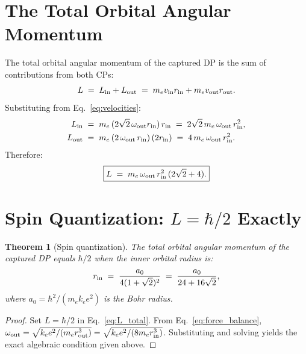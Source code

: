 \documentclass[12pt]{article}
\newtheorem{theorem}{Theorem}[section]
\newcommand{\rin}{r_{\rm in}}
\newcommand{\rout}{r_{\rm out}}
\newcommand{\oout}{\omega_{\rm out}}
\newcommand{\aBohr}{a_0}
\begin{document}
\section{The Total Orbital Angular Momentum}
\label{sec:angmom}

The total orbital angular momentum of the captured DP is the sum of
contributions from both CPs:
\begin{equation}
  L \;=\; L_{\rm in} + L_{\rm out}
  \;=\; m_e v_{\rm in}\rin + m_e v_{\rm out}\rout.
  \label{eq:L_sum}
\end{equation}
Substituting from Eq.~\eqref{eq:velocities}:
\begin{align}
  L_{\rm in} &\;=\; m_e\,(2\sqrt{2}\,\oout\rin)\,\rin
  \;=\; 2\sqrt{2}\,m_e\,\oout\,\rin^2, \notag\\
  L_{\rm out} &\;=\; m_e\,(2\,\oout\,\rin)\,(2\rin)
  \;=\; 4\,m_e\,\oout\,\rin^2.
  \label{eq:L_parts}
\end{align}
Therefore:
\begin{equation}
  \boxed{L \;=\; m_e\,\oout\,\rin^2\,(2\sqrt{2}+4).}
  \label{eq:L_total}
\end{equation}

\section{Spin Quantization: $L = \hbar/2$ Exactly}
\label{sec:quantization}

\begin{theorem}[Spin quantization]
\label{thm:spin}
The total orbital angular momentum of the captured DP equals $\hbar/2$
when the inner orbital radius is:
\begin{equation}
  \rin \;=\; \frac{\aBohr}{4(1+\sqrt{2})^2}
  \;=\; \frac{\aBohr}{24+16\sqrt{2}},
  \label{eq:rin}
\end{equation}
where $\aBohr = \hbar^2/(m_e k_e e^2)$ is the Bohr radius.
\end{theorem}

\begin{proof}
Set $L = \hbar/2$ in Eq.~\eqref{eq:L_total}.  From
Eq.~\eqref{eq:force_balance}, $\oout = \sqrt{k_e e^2/(m_e\rout^3)} =
\sqrt{k_e e^2/(8m_e\rin^3)}$.  Substituting and solving yields the
exact algebraic condition given above.
\end{proof}
\end{document}
